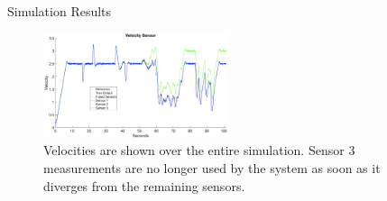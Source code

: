 \begin{section}{Simulation Results}
\begin{figure}
\vspace{1pt}
\centering
\includegraphics[width=0.48\textwidth]{Figures/Velocities.png}
\caption{Velocities are shown over the entire simulation. Sensor 3 measurements are no longer used by the system as soon as it diverges from the remaining sensors. }
\label{fig:total_velocity}
\end{figure}





\end{section}